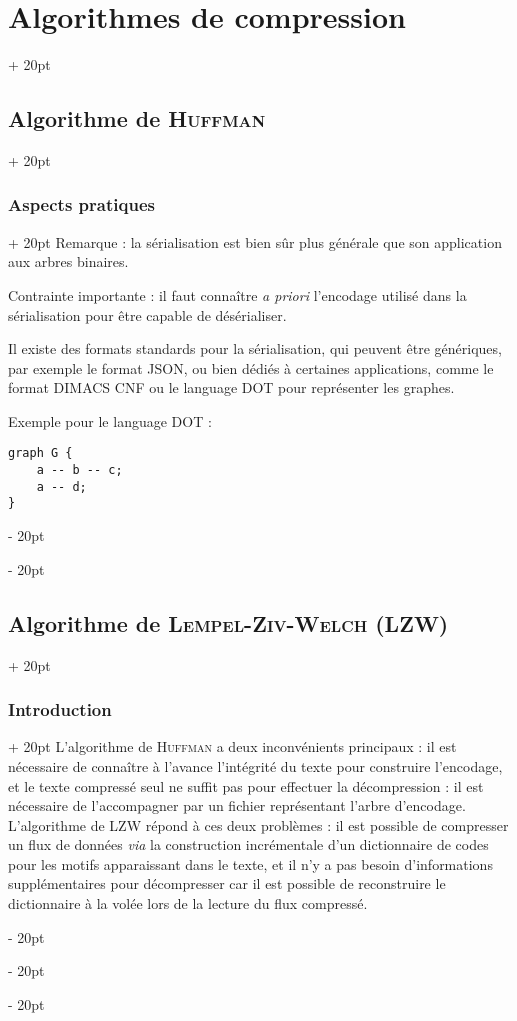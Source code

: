 \documentclass[a4paper, 12pt, twoside]{article}
\newcommand{\ind}[1][20pt]{\advance\leftskip + #1}
\newcommand{\deind}[1][20pt]{\advance\leftskip - #1}
\newenvironment{indt}[2][20pt]{#2 \par \ind[#1]}{\par \deind} %
\begin{document}
\begin{indt}{\section{Algorithmes de compression}}
\begin{indt}{\subsection{Algorithme de \textsc{Huffman}}}
\begin{indt}{\subsubsection{Aspects pratiques}}
                Remarque : la sérialisation est bien sûr plus générale que son application aux arbres binaires.

                Contrainte importante : il faut connaître \textit{a priori} l'encodage utilisé dans la sérialisation pour être capable de désérialiser.

                Il existe des formats standards pour la sérialisation, qui peuvent être génériques, par exemple le format JSON, ou bien dédiés à certaines applications, comme le format DIMACS CNF ou le language DOT pour représenter les graphes.

                Exemple pour le language DOT :

                \begin{lstlisting}[xleftmargin=80pt]
graph G {
    a -- b -- c;
    a -- d;
}\end{lstlisting}
                
                \begin{center}
                \end{center}
            \end{indt}
        \end{indt}

        \vspace{12pt}
        
        \begin{indt}{\subsection{Algorithme de \textsc{Lempel-Ziv-Welch} (LZW)}}
            \begin{indt}{\subsubsection{Introduction}}
                L'algorithme de \textsc{Huffman} a deux inconvénients principaux : il est nécessaire de connaître à l'avance l'intégrité du texte pour construire l'encodage, et le texte compressé seul ne suffit pas pour effectuer la décompression : il est nécessaire de l'accompagner par un fichier représentant l'arbre d'encodage.
                L'algorithme de LZW répond à ces deux problèmes : il est possible de compresser un flux de données \textit{via} la construction incrémentale d'un dictionnaire de codes pour les motifs apparaissant dans le texte, et il n'y a pas besoin d'informations supplémentaires pour décompresser car il est possible de reconstruire le dictionnaire à la volée lors de la lecture du flux compressé.
            \end{indt}


\end{indt}
\end{indt}
\end{document}
